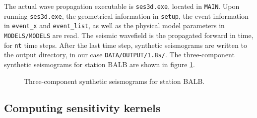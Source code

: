 The actual wave propagation executable is \texttt{ses3d.exe}, located in \texttt{MAIN}. Upon running \texttt{ses3d.exe}, the geometrical information in \texttt{setup}, the event information in \texttt{event\_x} and \texttt{event\_list}, as well as the physical model parameters in \texttt{MODELS/MODELS} are read. The seismic wavefield is the propagated forward in time, for \texttt{nt} time steps. After the last time step, synthetic seismograms are written to the output directory, in our case \texttt{DATA/OUTPUT/1.8s/}. The three-component synthetic seismograms for station BALB are shown in figure \ref{F:seismograms}.
\begin{center}
\begin{figure}
\center{} 
\caption{Three-component synthetic seismograms for station BALB.}\label{F:seismograms}
\end{figure}
\end{center}


\subsection{Computing sensitivity kernels}\label{S:kernels}

